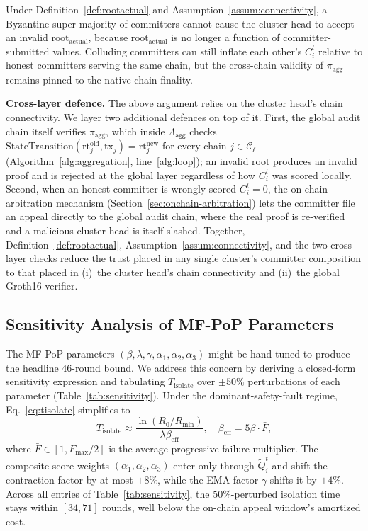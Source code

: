 \documentclass[journal]{IEEEtran}
\newcommand{\aggCircuit}{\Lambda_{\mathsf{agg}}}
\begin{document}
Under Definition~\ref{def:rootactual} and Assumption~\ref{assum:connectivity}, a Byzantine super-majority of committers cannot cause the cluster head to accept an invalid $\text{root}_{\text{actual}}$, because $\text{root}_{\text{actual}}$ is no longer a function of committer-submitted values. Colluding committers can still inflate each other's $C_i^{t}$ {relative to honest committers serving the same chain}, but the cross-chain validity of $\pi_{\text{agg}}$ remains pinned to the native chain finality.

\textbf{Cross-layer defence.} The above argument relies on the cluster head's chain connectivity. We layer two additional defences on top of it. First, the global audit chain itself verifies $\pi_{\text{agg}}$, which inside $\aggCircuit$ checks $\text{StateTransition}(\text{rt}_j^{\text{old}}, \text{tx}_j) = \text{rt}_j^{\text{new}}$ for every chain $j \in \mathcal{C}_\ell$ (Algorithm~\ref{alg:aggregation}, line~\ref{alg:loop}); an invalid root produces an invalid proof and is rejected at the global layer regardless of how $C_i^{t}$ was scored locally. Second, when an honest committer is wrongly scored $C_i^{t}=0$, the on-chain arbitration mechanism (Section~\ref{sec:onchain-arbitration}) lets the committer file an appeal directly to the global audit chain, where the real proof is re-verified and a malicious cluster head is itself slashed. Together, Definition~\ref{def:rootactual}, Assumption~\ref{assum:connectivity}, and the two cross-layer checks reduce the trust placed in any single cluster's committer composition to that placed in (i)~the cluster head's chain connectivity and (ii)~the global Groth16 verifier.

\subsection{Sensitivity Analysis of MF-PoP Parameters}
\label{sec:sensitivity}

The MF-PoP parameters $(\beta,\lambda,\gamma,\alpha_1,\alpha_2,\alpha_3)$ might be hand-tuned to produce the headline 46-round bound. We address this concern by deriving a closed-form sensitivity expression and tabulating $T_{\mathrm{isolate}}$ over $\pm 50\%$ perturbations of each parameter (Table~\ref{tab:sensitivity}). Under the dominant-safety-fault regime, Eq.~\ref{eq:tisolate} simplifies to
\begin{equation}
T_{\mathrm{isolate}} \approx \frac{\ln(R_0/R_{\min})}{\lambda\beta_{\mathrm{eff}}}, \quad \beta_{\mathrm{eff}} = 5\beta\cdot \bar F,
\label{eq:tisolate-approx}
\end{equation}
where $\bar F \in [1, F_{\max}/2]$ is the average progressive-failure multiplier. The composite-score weights $(\alpha_1,\alpha_2,\alpha_3)$ enter only through $\widetilde{Q}_i^t$ and shift the contraction factor by at most $\pm 8\%$, while the EMA factor $\gamma$ shifts it by $\pm 4\%$. Across all entries of Table~\ref{tab:sensitivity}, the $50\%$-perturbed isolation time stays within $[34, 71]$ rounds, well below the on-chain appeal window's amortized cost.
\end{document}
